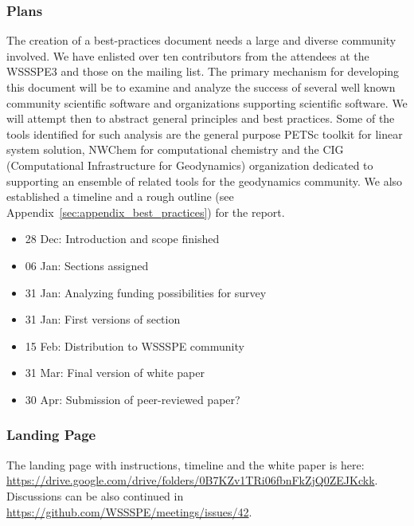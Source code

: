 \subsubsection{Plans}
The creation of a best-practices document needs a large and diverse community involved. We have enlisted over ten contributors from the attendees at the WSSSPE3 and 
those on the mailing list.
The primary mechanism for developing this document will be to examine and analyze the success of several well known community scientific
software and organizations supporting scientific software.
We will attempt then to abstract general principles and best practices.
Some of the tools identified for such analysis are
the general purpose PETSc toolkit for linear system solution, NWChem for computational chemistry and the CIG (Computational Infrastructure for Geodynamics) organization dedicated to supporting an ensemble of related tools for the geodynamics community. 
We also established a timeline and a rough outline (see Appendix~\ref{sec:appendix_best_practices}) for the report.

\begin{itemize}
%
\item 28 Dec: Introduction and scope finished
\item 06 Jan: Sections assigned
\item 31 Jan: Analyzing funding possibilities for survey
\item 31 Jan: First versions of section
\item 15 Feb: Distribution to WSSSPE community
\item 31 Mar: Final version of white paper
\item 30 Apr: Submission of peer-reviewed paper?
\end{itemize}


\subsubsection{Landing Page}
The landing page with instructions, timeline and the white paper is here: \url{https://drive.google.com/drive/folders/0B7KZv1TRi06fbnFkZjQ0ZEJKckk}.
Discussions can be also continued in \url{https://github.com/WSSSPE/meetings/issues/42}.
